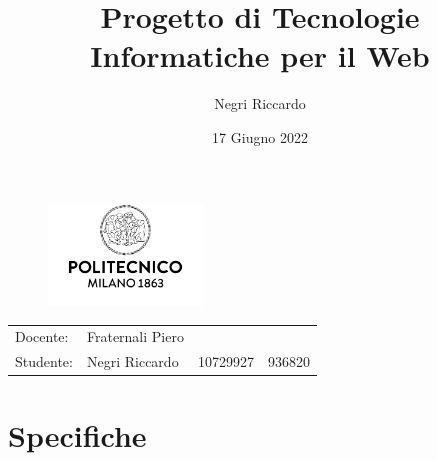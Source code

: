 \documentclass{article}
\title{\vspace{-2cm}Progetto di Tecnologie Informatiche per il Web} %
\author{Negri Riccardo} %
\date{17 Giugno 2022}
\begin{document}
\maketitle

\begin{figure}[H]
\centering
\includegraphics[width=0.365\textwidth]{assets/logo.jpg}
\end{figure}

\begin{center}
\begin{tabular}{l l l l}
Docente: & Fraternali Piero& & \\ 
Studente: & Negri Riccardo & 10729927 & 936820 
\end{tabular}
\end{center}

\tableofcontents
\pagebreak

\section{Specifiche}
\end{document}
